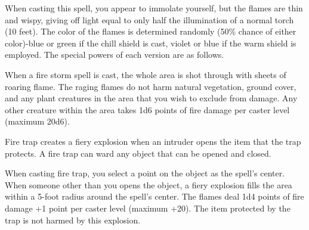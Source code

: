 \begin{multicols}{2}
\begin{small}
\smallskip\noindent When casting this spell, you appear to immolate yourself, but the flames are thin and wispy, giving off light equal to only half the illumination of a normal torch (10 feet). The color of the flames is determined randomly (50\% chance of either color)-blue or green if the chill shield is cast, violet or blue if the warm shield is employed. The special powers of each version are as follows.


\noindent When a fire storm spell is cast, the whole area is shot through with sheets of roaring flame. The raging flames do not harm natural vegetation, ground cover, and any plant creatures in the area that you wish to exclude from damage. Any other creature within the area takes 1d6 points of fire damage per caster level (maximum 20d6).

\noindent Fire trap creates a fiery explosion when an intruder opens the item that the trap protects. A fire trap can ward any object that can be opened and closed.

\smallskip\noindent When casting fire trap, you select a point on the object as the spell's center. When someone other than you opens the object, a fiery explosion fills the area within a 5-foot radius around the spell's center. The flames deal 1d4 points of fire damage +1 point per caster level (maximum +20). The item protected by the trap is not harmed by this explosion.


\end{small}
\end{multicols}
